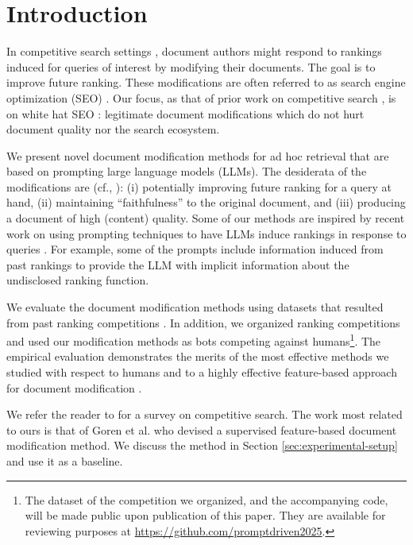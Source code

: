 \section{Introduction}
\label{sec:intro}
In competitive search settings \cite{Kurland+Tennnholtz:22a}, document
authors might respond to rankings induced for queries of interest by
modifying their documents. The goal is to improve
future ranking. These modifications are often referred to as search
engine optimization (SEO) \cite{Gyongyi+Molina:05a}. Our focus, as
that of prior work on competitive search
\cite{raifer2017information,goren2020ranking,Kurland+Tennnholtz:22a}, is on white hat SEO \cite{Gyongyi+Molina:05a}:
legitimate document modifications which do not hurt document quality
nor the search ecosystem.

We present novel document modification methods for ad hoc retrieval that are based on prompting large language models (LLMs). The desiderata of the modifications are (cf.,
\cite{goren2020ranking}): (i) potentially improving future ranking for a query at hand, (ii)
maintaining ``faithfulness'' to the original document, and (iii) producing a document of high (content) quality. Some of our methods are inspired by recent work on using
prompting techniques to have LLMs induce rankings in response to
queries \cite{Liang+al:22a,qin2023large,ma2023zero}. For example, some of the
prompts include information induced from past rankings to provide the
LLM with implicit information about the undisclosed ranking function.

We evaluate the document modification methods using datasets that
resulted from past ranking competitions
\cite{raifer2017information,Mordo+al:25a}. In addition, we organized
ranking competitions and used our modification methods as bots
competing against humans\footnote{The dataset of the competition we
  organized, and the accompanying code, will be made public upon
  publication of this paper. They are available for reviewing purposes
  at \url{https://github.com/promptdriven2025}.}. The empirical
evaluation demonstrates the merits of the most effective methods we
studied with respect to humans and to a highly effective feature-based
approach for document modification
\cite{goren2020ranking}.

   We refer the reader to \cite{Kurland+Tennnholtz:22a} for a survey on competitive search. The work most related to ours is that of
  Goren et al. \cite{goren2020ranking} who devised a supervised
  feature-based document modification method. We discuss the method in Section \ref{sec:experimental-setup} and use it as a baseline. 

